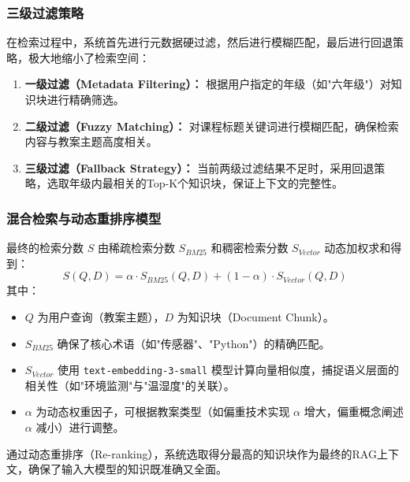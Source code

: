 \documentclass[12pt,a4paper,fontset=fandol]{ctexart}
\begin{document}
\subsubsection{三级过滤策略}
在检索过程中，系统首先进行元数据硬过滤，然后进行模糊匹配，最后进行回退策略，极大地缩小了检索空间：
\begin{enumerate}
    \item \textbf{一级过滤（Metadata Filtering）：} 根据用户指定的年级（如"六年级"）对知识块进行精确筛选。
    \item \textbf{二级过滤（Fuzzy Matching）：} 对课程标题关键词进行模糊匹配，确保检索内容与教案主题高度相关。
    \item \textbf{三级过滤（Fallback Strategy）：} 当前两级过滤结果不足时，采用回退策略，选取年级内最相关的Top-K个知识块，保证上下文的完整性。
\end{enumerate}

\subsubsection{混合检索与动态重排序模型}
最终的检索分数 $S$ 由稀疏检索分数 $S_{BM25}$ 和稠密检索分数 $S_{Vector}$ 动态加权求和得到：
\begin{equation}
    S(Q, D) = \alpha \cdot S_{BM25}(Q, D) + (1 - \alpha) \cdot S_{Vector}(Q, D)
\end{equation}
其中：
\begin{itemize}
    \item $Q$ 为用户查询（教案主题），$D$ 为知识块（Document Chunk）。
    \item $S_{BM25}$ 确保了核心术语（如"传感器"、"Python"）的精确匹配。
    \item $S_{Vector}$ 使用 \texttt{text-embedding-3-small} 模型计算向量相似度，捕捉语义层面的相关性（如"环境监测"与"温湿度"的关联）。
    \item $\alpha$ 为动态权重因子，可根据教案类型（如偏重技术实现 $\alpha$ 增大，偏重概念阐述 $\alpha$ 减小）进行调整。
\end{itemize}
通过动态重排序（Re-ranking），系统选取得分最高的知识块作为最终的RAG上下文，确保了输入大模型的知识既准确又全面。
\end{document}
